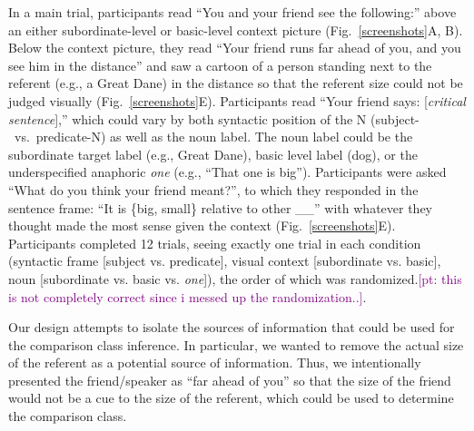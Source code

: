 \documentclass[10pt,letterpaper]{article}
\newcommand{\pt}[1]{\textcolor{Purple}{[pt: #1]}}
\begin{document}
In a main trial, participants read “You and your friend see the following:” above an either subordinate-level or basic-level context picture (Fig.~\ref{screenshots}A, B). 
Below the context picture, they read “Your friend runs far ahead of you, and you see him in the distance” and saw a cartoon of a person standing next to the referent (e.g., a Great Dane) in the distance so that the referent size could not be judged visually (Fig.~\ref{screenshots}E). 
Participants read ``Your friend says: [\emph{critical sentence}],'' which could vary by both syntactic position of the N (subject-~vs.~predicate-N) as well as the noun label. 
The noun label could be the subordinate target label (e.g., Great Dane), basic level label (dog), or the underspecified anaphoric \emph{one} (e.g., ``That one is big''). 
Participants were asked “What do you think your friend meant?”, to which they responded in the sentence frame: “It is \{big, small\} relative to other \_\_” with whatever they thought made the most sense given the context (Fig.~\ref{screenshots}E).
Participants completed 12 trials, seeing exactly one trial in each condition (syntactic frame [subject vs. predicate], visual context [subordinate vs. basic], noun [subordinate vs. basic vs. \emph{one}]), the order of which was randomized.\pt{this is not completely correct since i messed up the randomization..}.

Our design attempts to isolate the sources of information that could be used for the comparison class inference. 
In particular, we wanted to remove the actual size of the referent as a potential source of information. 
Thus, we intentionally presented the friend/speaker as ``far ahead of you'' so that the size of the friend would not be a cue to the size of the referent, which could be used to determine the comparison class. 

\end{document}
